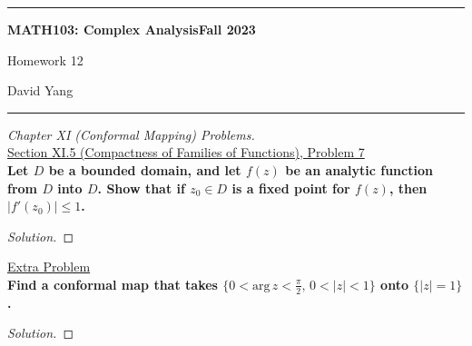 \documentclass[11pt]{article}
\newenvironment{solution}
  {\renewcommand\qedsymbol{$\blacksquare$}\begin{proof}[Solution]}
  {\end{proof}}
\theoremstyle{definition}
\begin{document}
	\hrule
	\begin{center}
        \textbf{MATH103: Complex Analysis}\hfill \textbf{Fall 2023}\newline


		{\Large Homework 12}

		David Yang
	\end{center}

\hrule

\vspace{1em}


\textit{Chapter XI (Conformal Mapping) Problems.} \\

\underline{Section XI.5 (Compactness of Families of Functions), Problem 7}\\

\textbf{Let $D$ be a bounded domain, and let $f(z)$ be an analytic function from $D$ into $D$. Show that if $z_0 \in D$ is a fixed point for $f(z)$, then $|f'(z_0)| \leq 1$.}

\begin{solution}

\end{solution}

\newpage

\underline{Extra Problem} \\

\textbf{Find a conformal map that takes $\{0 < \mathrm{arg} \, z < \frac{\pi}{2}, \, 0 < |z| < 1 \}$ onto $\{|z| = 1\}$.}

\begin{solution}
	
\end{solution}
\end{document}
